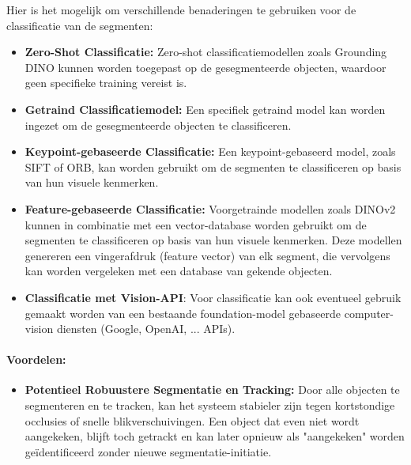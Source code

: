 Hier is het mogelijk om verschillende benaderingen te gebruiken voor de classificatie van de segmenten:
\begin{itemize}
    \item \textbf{Zero-Shot Classificatie:} Zero-shot classificatiemodellen zoals Grounding DINO kunnen worden toegepast op de gesegmenteerde objecten, waardoor geen specifieke training vereist is.
    \item \textbf{Getraind Classificatiemodel:} Een specifiek getraind model kan worden ingezet om de gesegmenteerde objecten te classificeren.
    \item \textbf{Keypoint-gebaseerde Classificatie:} Een keypoint-gebaseerd model, zoals SIFT of ORB, kan worden gebruikt om de segmenten te classificeren op basis van hun visuele kenmerken.
    \item \textbf{Feature-gebaseerde Classificatie:} Voorgetrainde modellen zoals DINOv2 kunnen in combinatie met een vector-database worden gebruikt om de segmenten te classificeren op basis van hun visuele kenmerken.
    Deze modellen genereren een vingerafdruk (feature vector) van elk segment, die vervolgens kan worden vergeleken met een database van gekende objecten.
    \item \textbf{Classificatie met Vision-API}: Voor classificatie kan ook eventueel gebruik gemaakt worden van een bestaande foundation-model gebaseerde computer-vision diensten (Google, OpenAI, ... APIs).
\end{itemize}

\paragraph{Voordelen:}
\begin{itemize}
    \item \textbf{Potentieel Robuustere Segmentatie en Tracking:} Door alle objecten te segmenteren en te tracken, kan het systeem stabieler zijn tegen kortstondige 
    occlusies of snelle blikverschuivingen. Een object dat even niet wordt aangekeken, blijft toch getrackt en kan later opnieuw als "aangekeken" worden geïdentificeerd zonder nieuwe segmentatie-initiatie.
\end{itemize}

